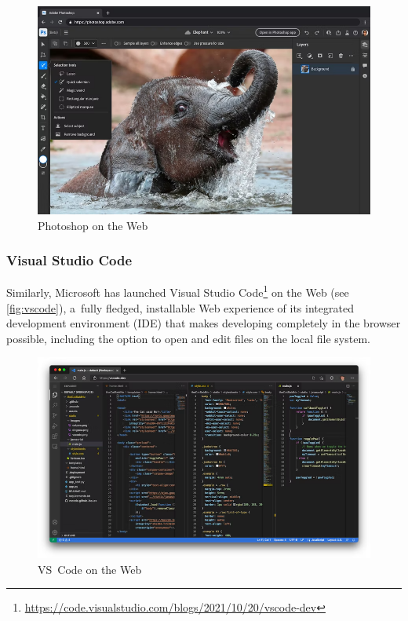 \documentclass[sigconf]{acmart}
\begin{document}
\begin{figure}[b]
    \centering
    \includegraphics[width=\columnwidth]{photoshop.png}
\caption{Photoshop on the Web}
    \label{fig:photoshop}
\end{figure}

\subsubsection{Visual Studio Code}
Similarly, Microsoft has launched Visual Studio Code\footnote{\url{https://code.visualstudio.com/blogs/2021/10/20/vscode-dev}} on the Web (see \autoref{fig:vscode}), a~fully fledged, installable Web experience of its integrated development environment (IDE) that makes developing completely in the browser possible, including the option to open and edit files on the local file system.

\begin{figure}[t]
    \centering
    \includegraphics[width=0.9\columnwidth]{vscode.png}
    \caption{VS~Code on the Web}
    \label{fig:vscode}
\end{figure}
\end{document}
